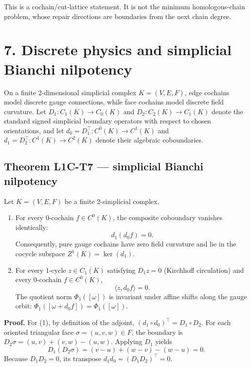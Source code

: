 \documentclass[
]{article}
\providecommand{\tightlist}{%
  \setlength{\itemsep}{0pt}\setlength{\parskip}{0pt}}
\providecommand{\tightlist}{%
  \setlength{\itemsep}{0pt}\setlength{\parskip}{0pt}}
\begin{document}
This is a cochain/cut-lattice statement. It is not the minimum homologous-chain
problem, whose repair directions are boundaries from the next chain degree.

\section{7. Discrete physics and simplicial Bianchi nilpotency}\label{discrete-physics-and-simplicial-bianchi-nilpotency}

On a finite 2-dimensional simplicial complex \(K = (V, E, F)\), edge cochains
model discrete gauge connections, while face cochains model discrete field
curvature. Let \(D_1: C_1(K) \to C_0(K)\) and \(D_2: C_2(K) \to C_1(K)\) denote the
standard signed simplicial boundary operators with respect to chosen orientations,
and let \(d_0 = D_1^\top: C^0(K) \to C^1(K)\) and \(d_1 = D_2^\top: C^1(K) \to C^2(K)\)
denote their algebraic coboundaries.

\subsection{Theorem L1C-T7 --- simplicial Bianchi nilpotency}\label{theorem-l1c-t7-simplicial-bianchi-nilpotency}

Let \(K = (V, E, F)\) be a finite 2-simplicial complex.

\begin{enumerate}
\def\labelenumi{\arabic{enumi}.}
\tightlist
\item
  For every 0-cochain \(f \in C^0(K)\), the composite coboundary vanishes identically:
  \[d_1(d_0 f) = 0.\]
  Consequently, pure gauge cochains have zero field curvature and lie in the
  cocycle subspace \(Z^1(K) = \ker(d_1)\).
\item
  For every 1-cycle \(z \in C_1(K)\) satisfying \(D_1 z = 0\) (Kirchhoff circulation)
  and every 0-cochain \(f \in C^0(K)\),
  \[\langle z, d_0 f \rangle = 0.\]
  The quotient norm \(\Phi_1([\omega])\) is invariant under affine shifts along the
  gauge orbit: \(\Phi_1([\omega + d_0 f]) = \Phi_1([\omega])\).
\end{enumerate}

\textbf{Proof.}
For (1), by definition of the adjoint, \((d_1 \circ d_0)^\top = D_1 \circ D_2\).
For each oriented triangular face \(\sigma = (u, v, w) \in F\), the boundary is
\(D_2 \sigma = (u,v) + (v,w) - (u,w)\). Applying \(D_1\) yields
\[D_1(D_2 \sigma) = (v - u) + (w - v) - (w - u) = 0.\]
Because \(D_1 D_2 = 0\), its transpose \(d_1 d_0 = (D_1 D_2)^\top = 0\).
\end{document}

